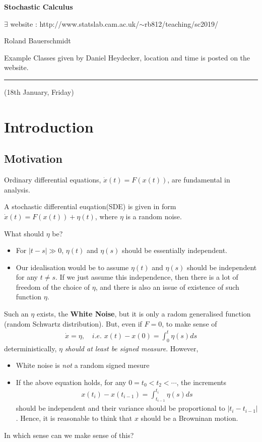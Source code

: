\documentclass[12pt,a4paper]{article}
\newcommand{\doublerule}[1][.4pt]{%
  \noindent
  \makebox[0pt][l]{\rule[.7ex]{\linewidth}{#1}}%
  \rule[.3ex]{\linewidth}{#1}}
\begin{document}
\def\doubleunderline#1{\underline{\underline{#1}}}

\newcommand{\newday}{\doublerule[0.5pt]}
\newcommand{\digression}{**********************************************************************************************}

\setlength\parindent{0pt}

\textbf{Stochastic Calculus}

$\exists$ website : http://www.statslab.cam.ac.uk/$\sim$rb812/teaching/sc2019/

Roland Bauerschmidt

Example Classes given by Daniel Heydecker, location and time is posted on the website.
\s

\newday

(18th January, Friday)
\s

\section{Introduction}

\subsection{Motivation}

Ordinary differential equations, $\dot{x}(t) = F(x(t))$, are fundamental in analysis.
\s

A stochastic differential euqation(SDE) is given in form $\dot{x}(t) = F(x(t)) + \eta(t)$, where $\eta$ is a random noise.

What should $\eta$ be? 
\begin{itemize}
\item For $|t-s| \gg 0$, $\eta(t)$ and $\eta(s)$ should be essentially independent.
\item Our idealisation would be to assume $\eta(t)$ and $\eta(s)$ should be independent for any $t\neq s$. If we just assume this independence, then there is a lot of freedom of the choice of $\eta$, and there is also an issue of existence of such function $\eta$.  
\end{itemize}
Such an $\eta$ exists, the \textbf{White Noise}, but it is only a radom generalised function (random Schwartz distribution). But, even if $F=0$, to make sense of
\begin{align*}
\dot{x} = \eta, \quad \textit{i.e.} \,\, x(t)-x(0)= \int_0^t \eta(s) ds
\end{align*}
deterministically, $\eta$ \emph{should at least be signed measure}. However,
\begin{itemize}
\item White noise is \emph{not} a random signed mesure
\item If the above equation holds, for any $0=t_0<t_2<\cdots$, the increments
\begin{align*}
x(t_i)-x(t_{i-1}) = \int_{t_{i-1}}^{t_i} \eta(s) ds
\end{align*}
should be independent and their variance should be proportional to $|t_i-t_{i-1}|$. Hence, it is reasonable to think that $x$ should be a Browninan motion.
\end{itemize}
In which sense can we make sense of this?
\s
\end{document}
